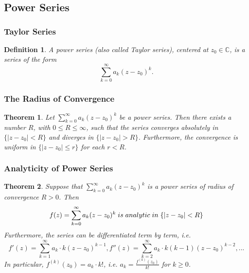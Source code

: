 \documentclass{article}
\newtheorem{theorem}{Theorem}[section]
\newtheorem{definition}{Definition}[section]
\begin{document}
\subsection{Power Series}
\subsubsection{Taylor Series}
\begin{definition}
A power series (also called Taylor series), centered at $z_0 \in \mathbb{C}$, is a series of the form
\begin{equation*}
\sum_{k=0}^{\infty} a_k(z - z_0)^k.
\end{equation*}
\end{definition}

\subsubsection{The Radius of Convergence}
\begin{theorem}
Let $\sum_{k=0}^{\infty}a_k(z - z_0)^k$ be a power series. Then there exists a number $R$, with $0 \leq R \leq \infty$, such that the series converges absolutely in $\{\left|z - z_0\right| < R \}$ and diverges in $\{\left|z - z_0\right| > R\}$. Furthermore, the convergence is uniform in $\{\left|z - z_0\right| \leq r\}$ for each $r < R$.
\end{theorem}

\subsubsection{Analyticity of Power Series}
\begin{theorem}
Suppose that $\sum_{k=0}^{\infty}a_k(z - z_0)^k$ is a power series of radius of convergence $R > 0$. Then
\begin{equation*}
f(z) = \sum_{k=0}^{\infty}a_k(z - z_0)^k \hspace{0.1cm} is \hspace{0.1cm} analytic \hspace{0.1cm} in \hspace{0.1cm} \{\left|z - z_0\right| < R \}
\end{equation*}
Furthermore, the series can be differentiated term by term, i.e.
\begin{equation*}
f'(z) = \sum_{k=1}^{\infty}a_k \cdot k(z - z_0)^{k-1}, f''(z) = \sum_{k=2}^{\infty}a_k \cdot k(k-1)(z - z_0)^{k-2},...
\end{equation*}
In particular, $f^{(k)}(z_0) = a_k \cdot k!$, i.e. $a_k = \frac{f^{(k)}(z_0)}{k!}$ for $k \geq 0$.
\end{theorem}
\end{document}
